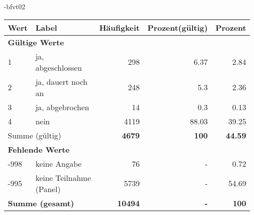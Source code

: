                 \vspace*{-\baselineskip}
					\begin{filecontents}{\jobname-bfvt02}
					\begin{longtable}{lXrrr}
					\toprule
					\textbf{Wert} & \textbf{Label} & \textbf{Häufigkeit} & \textbf{Prozent(gültig)} & \textbf{Prozent} \\
					\endhead
					\midrule
					\multicolumn{5}{l}{\textbf{Gültige Werte}}\\

					1 &
					\multicolumn{1}{X}{ ja, abgeschlossen   } &


					  \num{298} &
					  \num[round-mode=places,round-precision=2]{6,37} &
					    \num[round-mode=places,round-precision=2]{2,84} \\

					2 &
					\multicolumn{1}{X}{ ja, dauert noch an   } &


					  \num{248} &
					  \num[round-mode=places,round-precision=2]{5,3} &
					    \num[round-mode=places,round-precision=2]{2,36} \\

					3 &
					\multicolumn{1}{X}{ ja, abgebrochen   } &


					  \num{14} &
					  \num[round-mode=places,round-precision=2]{0,3} &
					    \num[round-mode=places,round-precision=2]{0,13} \\

					4 &
					\multicolumn{1}{X}{ nein   } &


					  \num{4119} &
					  \num[round-mode=places,round-precision=2]{88,03} &
					    \num[round-mode=places,round-precision=2]{39,25} \\
					\midrule
					\multicolumn{2}{l}{Summe (gültig)} &
					  \textbf{\num{4679}} &
					\textbf{100} &
					  \textbf{\num[round-mode=places,round-precision=2]{44,59}} \\
					\multicolumn{5}{l}{\textbf{Fehlende Werte}}\\
							-998 &
							keine Angabe &
							  \num{76} &
							 - &
							  \num[round-mode=places,round-precision=2]{0,72} \\
							-995 &
							keine Teilnahme (Panel) &
							  \num{5739} &
							 - &
							  \num[round-mode=places,round-precision=2]{54,69} \\
					\midrule
					\multicolumn{2}{l}{\textbf{Summe (gesamt)}} &
				      \textbf{\num{10494}} &
				    \textbf{-} &
				    \textbf{100} \\
					\bottomrule
					\end{longtable}
					\end{filecontents}

